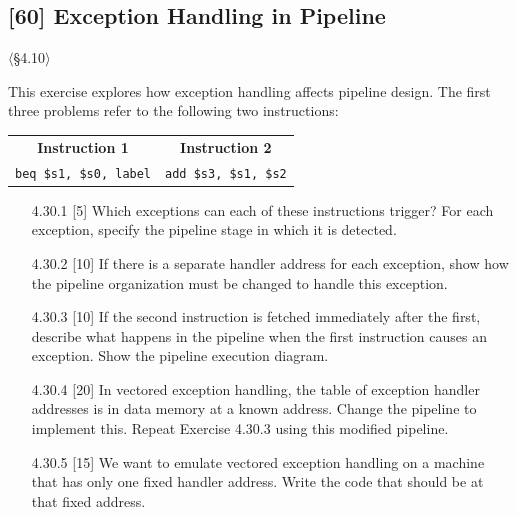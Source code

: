 \problembreak

\subsection{[60] Exception Handling in Pipeline}
\hypertarget{prob-4.30}{}
\noindent$\langle$\S4.10$\rangle$\medskip

\noindent This exercise explores how exception handling affects pipeline
design. The first three problems refer to the following two instructions:

\begin{center}
\begin{tabular}{cc}
\textbf{Instruction 1} & \textbf{Instruction 2} \\
\texttt{beq \$s1, \$s0, label} & \texttt{add \$s3, \$s1, \$s2}
\end{tabular}
\end{center}

\begin{enumerate}
  \item[4.30.1] [5] Which exceptions can each of these instructions trigger?
        For each exception, specify the pipeline stage in which it is
        detected.
  \item[4.30.2] [10] If there is a separate handler address for each
        exception, show how the pipeline organization must be changed to
        handle this exception.
  \item[4.30.3] [10] If the second instruction is fetched immediately after
        the first, describe what happens in the pipeline when the first
        instruction causes an exception. Show the pipeline execution diagram.
  \item[4.30.4] [20] In vectored exception handling, the table of exception
        handler addresses is in data memory at a known address. Change the
        pipeline to implement this. Repeat Exercise 4.30.3 using this
        modified pipeline.
  \item[4.30.5] [15] We want to emulate vectored exception handling on a
        machine that has only one fixed handler address. Write the code that
        should be at that fixed address.
\end{enumerate}

